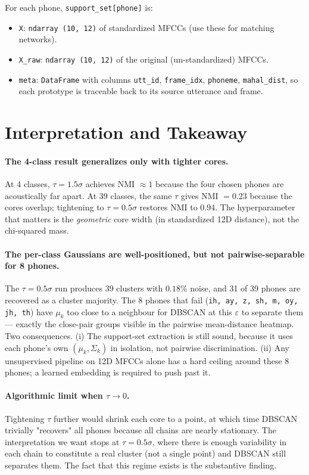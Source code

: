 \documentclass[11pt]{article}
\begin{document}
For each phone, \texttt{support\_set[phone]} is:
\begin{itemize}
\item \texttt{X}: \texttt{ndarray (10, 12)} of standardized MFCCs (use these for matching networks).
\item \texttt{X\_raw}: \texttt{ndarray (10, 12)} of the original (un-standardized) MFCCs.
\item \texttt{meta}: \texttt{DataFrame} with columns \texttt{utt\_id}, \texttt{frame\_idx}, \texttt{phoneme}, \texttt{mahal\_dist}, so each prototype is traceable back to its source utterance and frame.
\end{itemize}

\section*{Interpretation and Takeaway}

\paragraph{The 4-class result generalizes only with tighter cores.} At 4 classes, $\tau = 1.5\sigma$ achieves NMI $\approx 1$ because the four chosen phones are acoustically far apart. At 39 classes, the same $\tau$ gives NMI $= 0.23$ because the cores overlap; tightening to $\tau = 0.5\sigma$ restores NMI to $0.94$. The hyperparameter that matters is the \emph{geometric} core width (in standardized 12D distance), not the chi-squared mass.

\paragraph{The per-class Gaussians are well-positioned, but not pairwise-separable for 8 phones.} The $\tau = 0.5\sigma$ run produces 39 clusters with $0.18\%$ noise, and 31 of 39 phones are recovered as a cluster majority. The 8 phones that fail (\texttt{ih, ay, z, sh, m, oy, jh, th}) have $\mu_k$ too close to a neighbour for DBSCAN at this $\varepsilon$ to separate them --- exactly the close-pair groups visible in the pairwise mean-distance heatmap. Two consequences. (i) The support-set extraction is still sound, because it uses each phone's own $(\mu_k, \Sigma_k)$ in isolation, not pairwise discrimination. (ii) Any unsupervised pipeline on 12D MFCCs alone has a hard ceiling around these 8 phones; a learned embedding is required to push past it.

\paragraph{Algorithmic limit when $\tau \to 0$.} Tightening $\tau$ further would shrink each core to a point, at which time DBSCAN trivially "recovers" all phones because all chains are nearly stationary. The interpretation we want stops at $\tau = 0.5\sigma$, where there is enough variability in each chain to constitute a real cluster (not a single point) and DBSCAN still separates them. The fact that this regime exists is the substantive finding.
\end{document}
